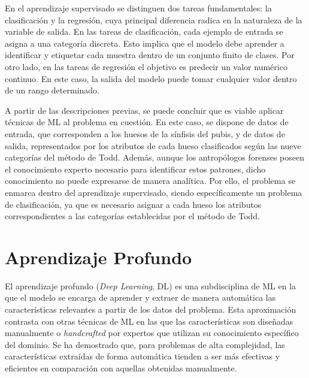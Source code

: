 En el aprendizaje supervisado se distinguen dos tareas fundamentales: la clasificación y la regresión, cuya principal diferencia radica en la naturaleza de la variable de salida. En las tareas de clasificación, cada ejemplo de entrada se asigna a una categoría discreta. Esto implica que el modelo debe aprender a identificar y etiquetar cada muestra dentro de un conjunto finito de clases. Por otro lado, en las tareas de regresión el objetivo es predecir un valor numérico continuo. En este caso, la salida del modelo puede tomar cualquier valor dentro de un rango determinado.

A partir de las descripciones previas, se puede concluir que es viable aplicar técnicas de ML al problema en cuestión. En este caso, se dispone de datos de entrada, que corresponden a los huesos de la sínfisis del pubis, y de datos de salida, representados por los atributos de cada hueso clasificados según las nueve categorías del método de Todd. Además, aunque los antropólogos forenses poseen el conocimiento experto necesario para identificar estos patrones, dicho conocimiento no puede expresarse de manera analítica. Por ello, el problema se enmarca dentro del aprendizaje supervisado, siendo específicamente un problema de clasificación, ya que es necesario asignar a cada hueso los atributos correspondientes a las categorías establecidas por el método de Todd.

\section{Aprendizaje Profundo}
\label{section:DL}
El aprendizaje profundo (\textit{Deep Learning}, DL) \cite{Goodfellow-et-al-2016, lecun_deep_2015, schmidhuber_deep_2015} es una subdisciplina de ML en la que el modelo se encarga de aprender y extraer de manera automática las características relevantes a partir de los datos del problema. Esta aproximación contrasta con otras técnicas de ML en las que las características son diseñadas manualmente o \textit{handcrafted} por expertos que utilizan su conocimiento específico del dominio. Se ha demostrado que, para problemas de alta complejidad, las características extraídas de forma automática tienden a ser más efectivas y eficientes en comparación con aquellas obtenidas manualmente.

